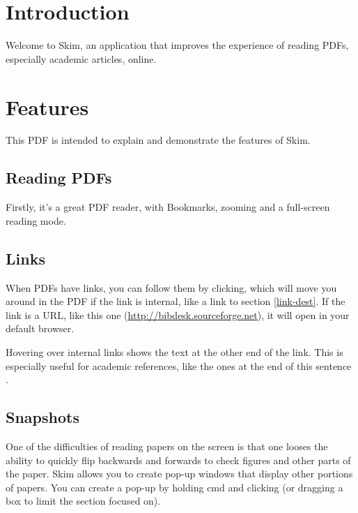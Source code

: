 \documentclass[11pt]{article}
\title{\myTitle}
\author{Skim Development Team}
\begin{document}
\maketitle

\section{Introduction}
Welcome to Skim, an application that improves the experience of reading PDFs, especially academic articles, online.  

\section{Features}

This PDF is intended to explain and demonstrate the features of Skim.

\subsection{Reading PDFs}
Firstly, it's a great PDF reader, with Bookmarks, zooming and a full-screen reading mode.

\subsection{Links}
When PDFs have links, you can follow them by clicking, which will move you around in the PDF if the link is internal, like a link to section \ref{link-dest}.  If the link is a URL, like this one (\url{http://bibdesk.sourceforge.net}), it will open in your default browser.
 
Hovering over internal links shows the text at the other end of the link.  This is especially useful for academic references, like the ones at the end of this sentence \cite{saltzer84endtoend,raymond1998the-cathedr,davis71interesting,brooks1975the-mythica}.

\subsection{Snapshots}

One of the difficulties of reading papers on the screen is that one looses the ability to quickly flip backwards and forwards to check figures and other parts of the paper.  Skim allows you to create pop-up windows that display other portions of papers.  You can create a pop-up by holding cmd and clicking (or dragging a box to limit the section focused on).
\end{document}

